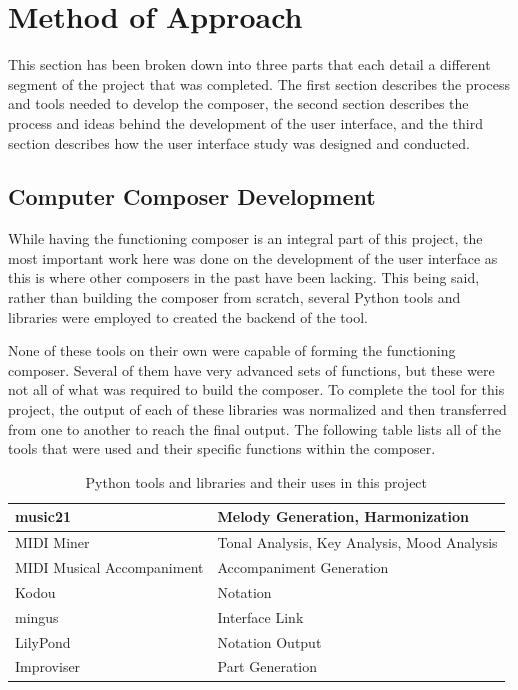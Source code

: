 \chapter{Method of Approach} 
\label{ch:method}

This section has been broken down into three parts that each detail a different segment of the project that was completed.  The first section describes the process and tools needed to develop the composer, the second section describes the process and ideas behind the development of the user interface, and the third section describes how the user interface study was designed and conducted.

\section{Computer Composer Development}
\label{sec:composerdev}

While having the functioning composer is an integral part of this project, the most important work here was done on the development of the user interface as this is where other composers in the past have been lacking.  This being said, rather than building the composer from scratch, several Python tools and libraries were employed to created the backend of the tool.

\vspace{\baselineskip}

None of these tools on their own were capable of forming the functioning composer.  Several of them have very advanced sets of functions, but these were not all of what was required to build the composer.  To complete the tool for this project, the output of each of these libraries was normalized and then transferred from one to another to reach the final output.  The following table lists all of the tools that were used and their specific functions within the composer.

\begin{table}[]
	\centering
	\caption{Python tools and libraries and their uses in this project}
	\begin{tabular}{|l|l|}
		\hline
		music21 & Melody Generation, Harmonization \\ \hline
		MIDI Miner & Tonal Analysis, Key Analysis, Mood Analysis \\ \hline
		MIDI Musical Accompaniment & Accompaniment Generation \\ \hline
		Kodou & Notation \\ \hline
		mingus & Interface Link \\ \hline
		LilyPond & Notation Output \\ \hline
		Improviser & Part Generation \\ \hline
	\end{tabular}
\end{table}

